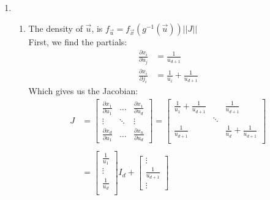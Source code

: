 \documentclass[paper=a4, fontsize=11pt]{scrartcl}
\begin{document}
\begin{enumerate}[1.]
  \item
    \begin{enumerate}[1]
      \item
        The density of $\vec{u}$, is $f_{\vec{u}} = f_{\vec{x}}(g^{-1}(\vec{u}))||J||$ \\

        First, we find the partials:
        \begin{align*}
          \frac{\partial x_i}{\partial u_j} &= \frac{1}{u_{d+1}} \\
          \frac{\partial x_i}{\partial j_i} &= \frac{1}{u_i} + \frac{1}{u_{d+1}}
        \end{align*}
        Which gives us the Jacobian:
        \begin{align*}
          J &=
              \begin{bmatrix}
                \frac{\partial x_1}{\partial u_1} & \ldots & \frac{\partial x_1}{\partial u_d} \\
                \vdots & \ddots & \vdots \\
                \frac{\partial x_d}{\partial u_1} & \ldots & \frac{\partial x_n}{\partial u_d}
              \end{bmatrix} =
              \begin{bmatrix}
                \frac{1}{u_1} + \frac{1}{u_{d+1}} & & \frac{1}{u_{d+1}} \\
                & \ddots & \\
                \frac{1}{u_{d+1}} & & \frac{1}{u_d} + \frac{1}{u_{d+1}} \\
              \end{bmatrix} \\ \\
            &=
              \begin{bmatrix}
                \frac{1}{u_1} \\
                \vdots \\
                \frac{1}{u_d} \\
              \end{bmatrix}I_d +
              \begin{bmatrix}
                \vdots \\
                \frac{1}{u_{d+1}} \\
                \vdots
              \end{bmatrix}

\end{align*}
\end{enumerate}
\end{enumerate}
\end{document}
